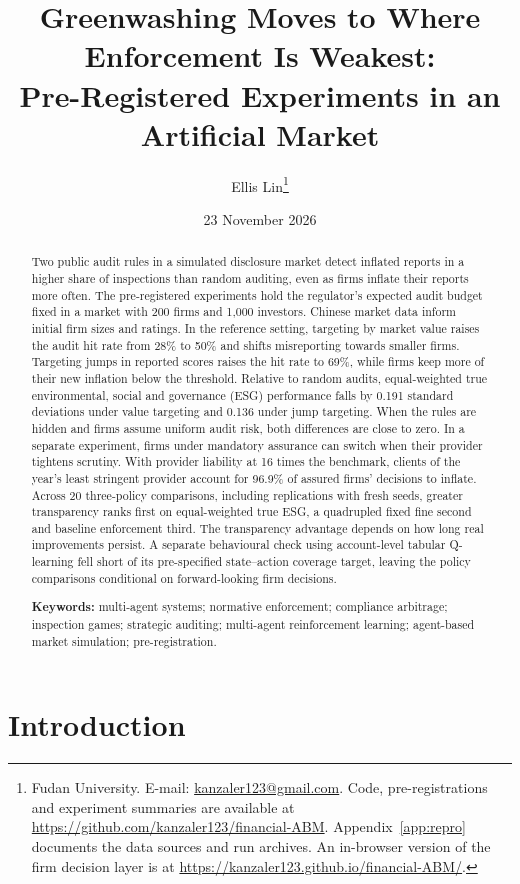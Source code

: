 \documentclass[11pt]{article}
\title{Greenwashing Moves to Where Enforcement Is Weakest:\\[2pt]
Pre-Registered Experiments in an Artificial Market}
\author{Ellis Lin\thanks{Fudan University. E-mail: \href{mailto:kanzaler123@gmail.com}{kanzaler123@gmail.com}. Code, pre-registrations and experiment summaries are available at \url{https://github.com/kanzaler123/financial-ABM}. Appendix~\ref{app:repro} documents the data sources and run archives. An in-browser version of the firm decision layer is at \url{https://kanzaler123.github.io/financial-ABM/}.}}
\date{23 November 2026}
\begin{document}
\maketitle

\begin{abstract}
\noindent Two public audit rules in a simulated disclosure market detect inflated reports in a higher share of inspections than random auditing, even as firms inflate their reports more often.
The pre-registered experiments hold the regulator's expected audit budget fixed in a market with 200 firms and 1,000 investors. Chinese market data inform initial firm sizes and ratings.
In the reference setting, targeting by market value raises the audit hit rate from 28\% to 50\% and shifts misreporting towards smaller firms.
Targeting jumps in reported scores raises the hit rate to 69\%, while firms keep more of their new inflation below the threshold.
Relative to random audits, equal-weighted true environmental, social and governance (ESG) performance falls by 0.191 standard deviations under value targeting and 0.136 under jump targeting.
When the rules are hidden and firms assume uniform audit risk, both differences are close to zero.
In a separate experiment, firms under mandatory assurance can switch when their provider tightens scrutiny. With provider liability at 16 times the benchmark, clients of the year's least stringent provider account for 96.9\% of assured firms' decisions to inflate.
Across 20 three-policy comparisons, including replications with fresh seeds, greater transparency ranks first on equal-weighted true ESG, a quadrupled fixed fine second and baseline enforcement third. The transparency advantage depends on how long real improvements persist.
A separate behavioural check using account-level tabular Q-learning fell short of its pre-specified state--action coverage target, leaving the policy comparisons conditional on forward-looking firm decisions.

\medskip
\noindent\textbf{Keywords:} multi-agent systems; normative enforcement; compliance arbitrage; inspection games; strategic auditing; multi-agent reinforcement learning; agent-based market simulation; pre-registration.
\end{abstract}

\newpage

\section{Introduction}
\end{document}
